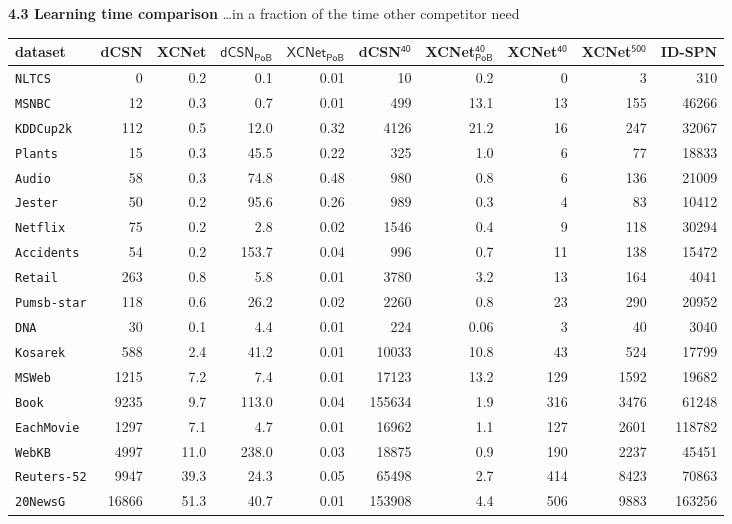 \documentclass[final]{beamer}
\begin{document}
\begin{frame}{}
\begin{textblock}{17.5}
\vspace{15pt}
{\bf 4.3 Learning time comparison} \dots in a fraction of the time
other competitor need
\vspace{-10pt}
\begin{table}[t]
  \centering
  \setlength{\tabcolsep}{3pt}  
\tiny
  \begin{tabular}{l rrr r r r r r r}
    dataset           & \textsf{dCSN} & \textsf{XCNet} & $\mathsf{dCSN_{PoB}}$ &
    $\mathsf{XCNet_{PoB}}$ &\textsf{dCSN$^{\mathsf{40}}$} & \textsf{XCNet$^{\mathsf{40}}_\mathsf{PoB}$}& \textsf{XCNet$^{\mathsf{40}}$} & \textsf{XCNet$^{\mathsf{500}}$} & \textsf{ID-SPN}\\
    \midrule
    \texttt{NLTCS}& 0&0.2&0.1	&0.01&10&0.2& 0 & 3 &310\\ 
    \texttt{MSNBC} & 12&0.3&0.7&	0.01&499&13.1& 13 & 155 &46266\\ 
    \texttt{KDDCup2k}&112&0.5&12.0&0.32&4126&21.2& 16& 247 &32067\\ 
    \texttt{Plants}&15&0.3&45.5	&0.22&325&1.0& 6 & 77 &18833\\ 
    \texttt{Audio} & 58&0.3&74.8&0.48&980&0.8&6 &136 &21009\\ 
    \texttt{Jester}&50&0.2&95.6&	0.26&989&0.3&4 & 83 &10412\\ 
    \texttt{Netflix}&75&0.2&2.8&	0.02&1546&0.4& 9& 118&30294\\ 
    \texttt{Accidents}&54&0.2&153.7	&0.04&996&0.7& 11& 138 &15472\\ 
    \texttt{Retail}&263&0.8&5.8	&0.01&3780&3.2& 13 & 164&4041\\ 
    \texttt{Pumsb-star}&118&0.6&26.2&	0.02&2260&0.8& 23 & 290 &20952\\ 
    \texttt{DNA}&30&0.1&4.4&	0.01&224&0.06& 3& 40 &3040\\ 
    \texttt{Kosarek}&588&2.4&41.2&	0.01&10033&10.8& 43 &524 &17799\\ 
    \texttt{MSWeb}&1215&7.2&7.4	&0.01&17123&13.2& 129 & 1592 &19682\\ 
    \texttt{Book}&9235&9.7&113.0	&0.04&155634&1.9& 316& 3476&61248\\ 
    \texttt{EachMovie}&1297&7.1&4.7	&0.01&16962&1.1& 127 & 2601&118782\\ 
    \texttt{WebKB}&4997&11.0&238.0&	0.03&18875&0.9& 190 & 2237 &45451\\ 
    \texttt{Reuters-52}&9947&39.3&24.3&	0.05&65498&2.7& 414 & 8423 &70863\\ 
    \texttt{20NewsG}&16866&51.3&40.7&	0.01&153908&4.4& 506& 9883&163256\\ 

\end{tabular}
\end{table}
\end{textblock}
\end{frame}
\end{document}
